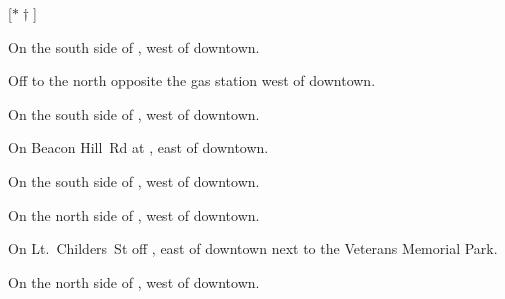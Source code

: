 
[$\ast\dagger$]

\begin{LocationList}

On the south side of , west of downtown.

Off  to the north opposite the gas station west of downtown.

\Location{\GasStation \Gas}
On the south side of , west of downtown.

On  Beacon Hill~Rd at , east of downtown.

On the south side of , west of downtown.

\Location{\RestArea \Rest}
On the north side of , west of downtown.

On Lt.\ Childers~St off , east of downtown next to the Veterans Memorial Park.

On the north side of , west of downtown.

\end{LocationList}
